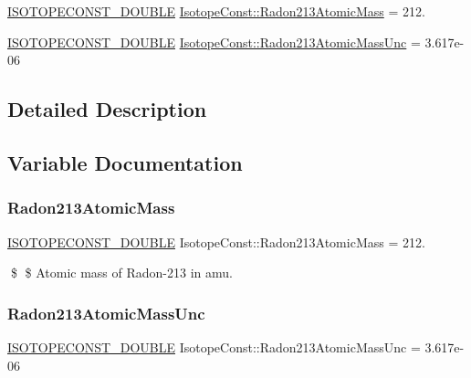 \begin{DoxyCompactItemize}
\item 
\mbox{\hyperlink{group___isotope_const-_macros_ga8f45a7272ce02c0b4c65c44636ed719a}{I\+S\+O\+T\+O\+P\+E\+C\+O\+N\+S\+T\+\_\+\+D\+O\+U\+B\+LE}} \mbox{\hyperlink{group___isotope_const-_radon-_rn213_ga460329fc7a6b3b6c8957d00b29316358}{Isotope\+Const\+::\+Radon213\+Atomic\+Mass}} = 212.
\item 
\mbox{\hyperlink{group___isotope_const-_macros_ga8f45a7272ce02c0b4c65c44636ed719a}{I\+S\+O\+T\+O\+P\+E\+C\+O\+N\+S\+T\+\_\+\+D\+O\+U\+B\+LE}} \mbox{\hyperlink{group___isotope_const-_radon-_rn213_ga6153deddcdbe3078090a90488b6ca601}{Isotope\+Const\+::\+Radon213\+Atomic\+Mass\+Unc}} = 3.\+617e-\/06
\end{DoxyCompactItemize}


\subsection{Detailed Description}


\subsection{Variable Documentation}
\mbox{\label{group___isotope_const-_radon-_rn213_ga460329fc7a6b3b6c8957d00b29316358}} 
\subsubsection{\texorpdfstring{Radon213\+Atomic\+Mass}{Radon213AtomicMass}}
{\footnotesize\ttfamily \mbox{\hyperlink{group___isotope_const-_macros_ga8f45a7272ce02c0b4c65c44636ed719a}{I\+S\+O\+T\+O\+P\+E\+C\+O\+N\+S\+T\+\_\+\+D\+O\+U\+B\+LE}} Isotope\+Const\+::\+Radon213\+Atomic\+Mass = 212.}

\$ \$ Atomic mass of Radon-\/213 in amu. \mbox{\label{group___isotope_const-_radon-_rn213_ga6153deddcdbe3078090a90488b6ca601}} 
\subsubsection{\texorpdfstring{Radon213\+Atomic\+Mass\+Unc}{Radon213AtomicMassUnc}}
{\footnotesize\ttfamily \mbox{\hyperlink{group___isotope_const-_macros_ga8f45a7272ce02c0b4c65c44636ed719a}{I\+S\+O\+T\+O\+P\+E\+C\+O\+N\+S\+T\+\_\+\+D\+O\+U\+B\+LE}} Isotope\+Const\+::\+Radon213\+Atomic\+Mass\+Unc = 3.\+617e-\/06}

